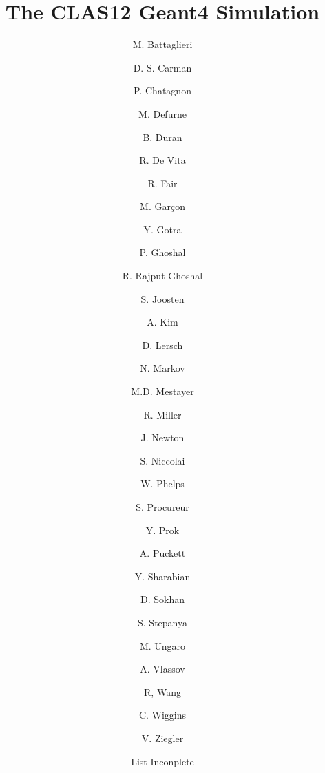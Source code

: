 \title{The CLAS12 Geant4 Simulation}




\author[B]{M. Battaglieri}
\author[A]{D. S. Carman}
\author[E]{P. Chatagnon}
\author[C]{M. Defurne}
\author[K]{B. Duran}
\author[B]{R. De Vita}
\author[A]{R. Fair}
\author[C]{M. Gar\c con}
\author[A]{Y. Gotra}
\author[A]{P. Ghoshal}
\author[A]{R. Rajput-Ghoshal}
\author[K]{S. Joosten}
\author[D]{A. Kim}
\author[J]{D. Lersch}
\author[D]{N. Markov}
\author[A]{M.D. Mestayer}
\author[A]{R. Miller}
\author[H]{J. Newton}
\author[E]{S. Niccolai}
\author[L]{W. Phelps}
\author[C]{S. Procureur}
\author[H, I]{Y. Prok}
\author[D]{A. Puckett}
\author[A]{Y. Sharabian}
\author[F]{D. Sokhan}
\author[A]{S. Stepanya}
\author[A]{M. Ungaro}
\author[G]{A. Vlassov}
\author[E]{R, Wang}
\author[A]{C. Wiggins}
\author[A]{V. Ziegler}
\author[A]{List Inconplete}

\address[A]{Thomas Jefferson National Accelerator Facility, Newport News, VA, USA}
\address[B]{Istituto Nazionale Di Fisica Nucleare, Genova, Italy}
\address[C]{IRFU, CEA, Universit\'e Paris-Saclay, F-91191 Gif-sur-Yvette, France}
\address[D]{University of Connecticut, Storrs, Connecticut}
\address[E]{Institut de Physique Nuclaire, CNRS-IN2P3, Univ. Paris-Sud, Universit Paris-Saclay, 91406 Orsay Cedex, France}
\address[F]{University of Glasgow, Glasgow G12 8QQ, United Kingdom }
\address[G]{Institute For Theoretical and Experimental Physics, Moscow, Russia}
\address[H]{Old Dominion University, Norfolk, VA, USA}
\address[I]{Virginia Commonwealth University, Richmond, VA, USA}
\address[J]{Florida State University, Tallahassee, FL, USA}
\address[K]{Temple University, Philadelphia, PA, USA}
\address[L]{George Washington University, Washington, DC, USA}
